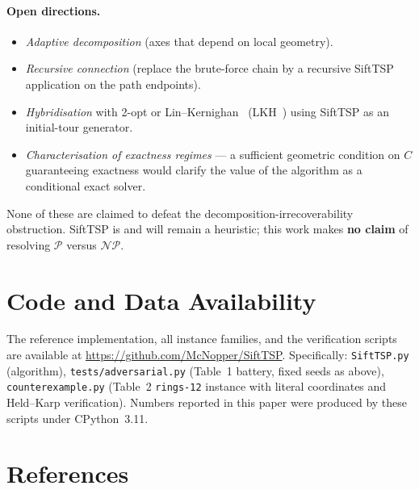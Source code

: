 \documentclass[11pt,a4paper]{article}
\begin{document}
\paragraph{Open directions.}
\begin{itemize}
\item \emph{Adaptive decomposition} (axes that depend on local
geometry).
\item \emph{Recursive connection} (replace the brute-force chain by a
recursive SiftTSP application on the path endpoints).
\item \emph{Hybridisation} with 2-opt or Lin--Kernighan~\cite{linkernighan1973}
(LKH~\cite{helsgaun2000}) using SiftTSP as an initial-tour generator.
\item \emph{Characterisation of exactness regimes} --- a sufficient
geometric condition on $C$ guaranteeing exactness would clarify the
value of the algorithm as a conditional exact solver.
\end{itemize}

None of these are claimed to defeat the decomposition-irrecoverability
obstruction. SiftTSP is and will remain a heuristic; this work makes
\textbf{no claim} of resolving $\mathcal{P}$ versus $\mathcal{NP}$.

\section*{Code and Data Availability}

The reference implementation, all instance families, and the
verification scripts are available at
\url{https://github.com/McNopper/SiftTSP}. Specifically:
\texttt{SiftTSP.py} (algorithm), \texttt{tests/adversarial.py} (Table~1
battery, fixed seeds as above), \texttt{counterexample.py} (Table~2
\texttt{rings-12} instance with literal coordinates and Held--Karp
verification). Numbers reported in this paper were produced by these
scripts under CPython~3.11.

\section*{References}
\end{document}
